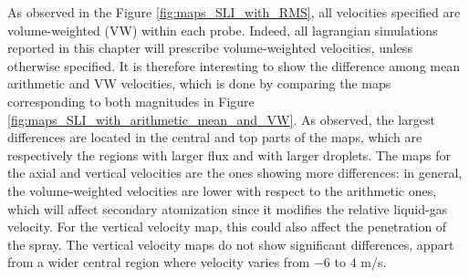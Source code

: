 As observed in the Figure \ref{fig:maps_SLI_with_RMS}, all velocities specified are volume-weighted (VW) within each probe. Indeed, all lagrangian simulations reported in this chapter will prescribe volume-weighted velocities, unless otherwise specified. It is therefore interesting to show the difference among mean arithmetic and VW velocities, which is done by comparing the maps corresponding to both magnitudes in Figure \ref{fig:maps_SLI_with_arithmetic_mean_and_VW}. As observed, the largest differences are located in the central and top parts of the maps, which are respectively the regions with larger flux and with larger droplets. The maps for the axial and vertical velocities are the ones showing more differences: in general, the volume-weighted velocities are lower with respect to the arithmetic ones, which will affect secondary atomization since it modifies the relative liquid-gas velocity. For the vertical velocity map, this could also affect the penetration of the spray. The vertical velocity maps do not show significant differences, appart from a wider central region where velocity varies from $-6$ to $4$ m/s. 




\clearpage

